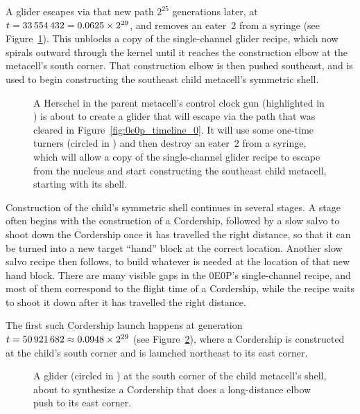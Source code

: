 A glider escapes via that new path $2^{25}$ generations later, at $t = 33{\,}554{\,}432 = 0.0625 \times 2^{29}$, and removes an eater~2 from a syringe (see Figure~\ref{fig:0e0p_timeline_33554432}). This unblocks a copy of the single-channel glider recipe, which now spirals outward through the kernel until it reaches the construction elbow at the metacell's south corner. That construction elbow is then pushed southeast, and is used to begin constructing the southeast child metacell's symmetric shell.

\begin{figure}[!htb]
	\centering
	\caption{A Herschel in the parent metacell's control clock gun (highlighted in ) is about to create a glider that will escape via the path that was cleared in Figure~\ref{fig:0e0p_timeline_0}. It will use some one-time turners (circled in ) and then destroy an eater~2 from a syringe, which will allow a copy of the single-channel glider recipe to escape from the nucleus and start constructing the southeast child metacell, starting with its shell.}
	\label{fig:0e0p_timeline_33554432}
\end{figure}

Construction of the child's symmetric shell continues in several stages. A stage often begins with the construction of a Cordership, followed by a slow salvo to shoot down the Cordership once it has travelled the right distance, so that it can be turned into a new target ``hand'' block at the correct location. Another slow salvo recipe then follows, to build whatever is needed at the location of that new hand block. There are many visible gaps in the 0E0P's single-channel recipe, and most of them correspond to the flight time of a Cordership, while the recipe waits to shoot it down after it has travelled the right distance.

The first such Cordership launch happens at generation $t = 50{\,}921{\,}682 \approx 0.0948 \times 2^{29}$ (see Figure~\ref{fig:0e0p_timeline_50921682}), where a Cordership is constructed at the child's south corner and is launched northeast to its east corner.


\clearpage%


\begin{figure}[!htb]
	\centering
	\caption{A glider (circled in ) at the south corner of the child metacell's shell, about to synthesize a Cordership that does a long-distance elbow push to its east corner.}
	\label{fig:0e0p_timeline_50921682}
\end{figure}

